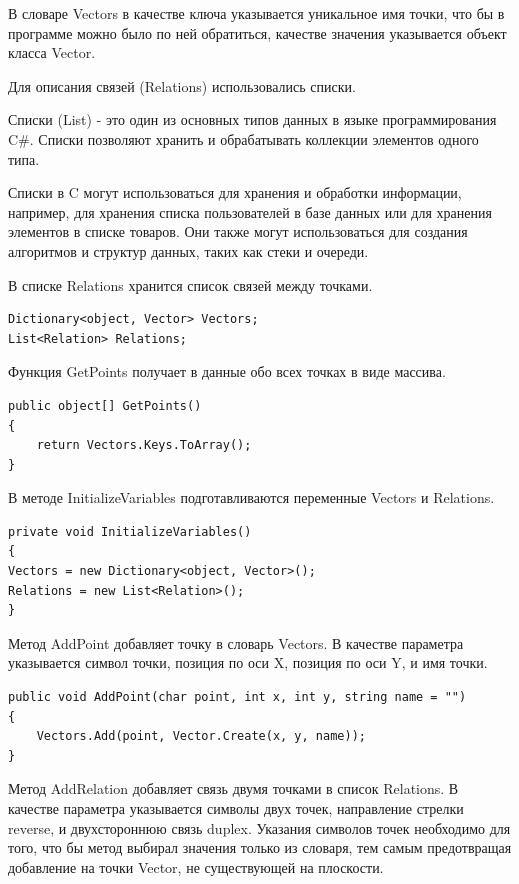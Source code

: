 \documentclass[a4paper,14pt, Times New Roman]{extarticle}
\begin{document}
В словаре Vectors в качестве ключа указывается уникальное имя точки, что бы в программе можно было по ней обратиться, качестве значения указывается объект класса Vector.

Для описания связей (Relations) использовались списки.

Списки (List) - это один из основных типов данных в языке программирования C\#. Списки позволяют хранить и обрабатывать коллекции элементов одного типа.

Списки в C могут использоваться для хранения и обработки информации, например, для хранения списка пользователей в базе данных или для хранения элементов в списке товаров. Они также могут использоваться для создания алгоритмов и структур данных, таких как стеки и очереди.

В списке Relations хранится список связей между точками.

\begin{lstlisting}
Dictionary<object, Vector> Vectors;
List<Relation> Relations;
\end{lstlisting}

Функция GetPoints получает в данные обо всех точках в виде массива.

\begin{lstlisting}
public object[] GetPoints()
{
    return Vectors.Keys.ToArray();
}
\end{lstlisting}

В методе InitializeVariables подготавливаются переменные Vectors и Relations.

\begin{lstlisting}
private void InitializeVariables()
{
Vectors = new Dictionary<object, Vector>();
Relations = new List<Relation>();
}
\end{lstlisting}

Метод AddPoint добавляет точку в словарь Vectors. В качестве параметра указывается символ точки, позиция по оси X, позиция по оси Y, и имя точки.

\begin{lstlisting}
public void AddPoint(char point, int x, int y, string name = "")
{
    Vectors.Add(point, Vector.Create(x, y, name));
}
\end{lstlisting}

Метод AddRelation добавляет связь двумя точками в список Relations. В качестве параметра указывается символы двух точек, направление стрелки reverse, и двухстороннюю связь duplex. Указания символов точек необходимо для того, что бы метод выбирал значения только из словаря, тем самым предотвращая добавление на точки Vector, не существующей на плоскости.
\end{document}
